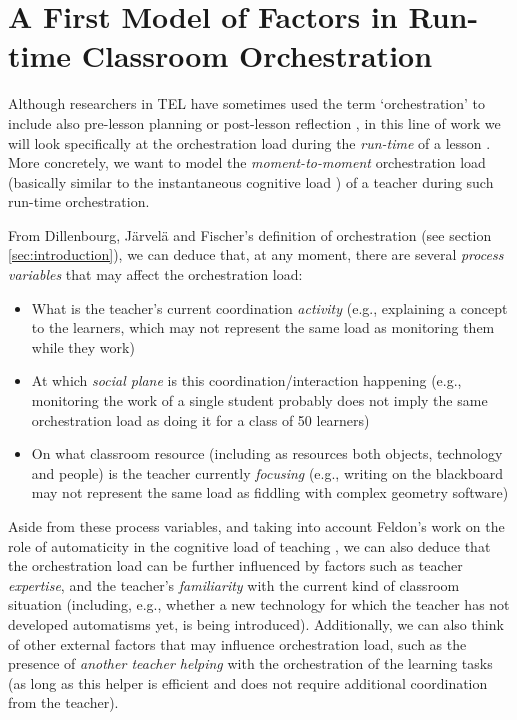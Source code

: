 \documentclass[10pt,journal,compsoc]{IEEEtran}
\begin{document}
\section{A First Model of Factors in Run-time Classroom Orchestration}
\label{sec:model}

Although researchers in TEL have sometimes used the term `orchestration' to include also pre-lesson planning or post-lesson reflection \cite{Prieto2011}, in this line of work we will look specifically at the orchestration load during the \textit{run-time} of a lesson \cite{Dillenbourg2013}. More concretely, we want to model the \textit{moment-to-moment} orchestration load (basically similar to the instantaneous cognitive load \cite{xie2000prediction}) of a teacher during such run-time orchestration.

From Dillenbourg, J\"arvel\"a and Fischer's definition of orchestration \cite{Dillenbourg2009} (see section \ref{sec:introduction}), we can deduce that, at any moment, there are several \textit{process variables} that may affect the orchestration load: 

\begin{itemize}
\item What is the teacher's current coordination \textit{activity} (e.g., explaining a concept to the learners, which may not represent the same load as monitoring them while they work)
\item At which \textit{social plane} is this coordination/interaction happening (e.g., monitoring the work of a single student probably does not imply the same orchestration load as doing it for a class of 50 learners)
\item On what classroom resource (including as resources both objects, technology and people) is the teacher currently \textit{focusing} (e.g., writing on the blackboard may not represent the same load as fiddling with complex geometry software)
\end{itemize}

Aside from these process variables, and taking into account Feldon's work on the role of automaticity in the cognitive load of teaching \cite{feldon2007cognitive}, we can also deduce that the orchestration load can be further influenced by factors such as teacher \textit{expertise}, and the teacher's \textit{familiarity} with the current kind of classroom situation (including, e.g., whether a new technology for which the teacher has not developed automatisms yet, is being introduced). Additionally, we can also think of other external factors that may influence orchestration load, such as the presence of \textit{another teacher helping} with the orchestration of the learning tasks (as long as this helper is efficient and does not require additional coordination from the teacher).
\end{document}
